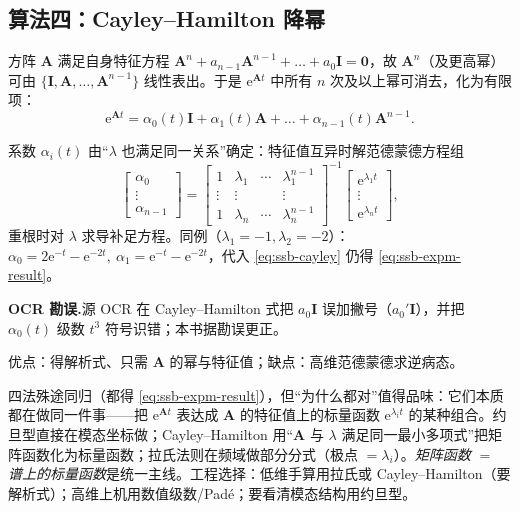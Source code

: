 \subsection{算法四：Cayley--Hamilton 降幂}
\begin{theorem}\label{thm:ssb-cayley}
方阵 $\mathbf{A}$ 满足自身特征方程 $\mathbf{A}^n+a_{n-1}\mathbf{A}^{n-1}+\dots+a_0\mathbf{I}=\mathbf{0}$，故 $\mathbf{A}^n$（及更高幂）可由 $\{\mathbf{I},\mathbf{A},\dots,\mathbf{A}^{n-1}\}$ 线性表出。于是 $\mathrm{e}^{\mathbf{A}t}$ 中所有 $n$ 次及以上幂可消去，化为有限项：
\begin{equation}
  \mathrm{e}^{\mathbf{A}t}=\alpha_0(t)\mathbf{I}+\alpha_1(t)\mathbf{A}+\dots+\alpha_{n-1}(t)\mathbf{A}^{n-1}.
  \label{eq:ssb-cayley}
\end{equation}
\end{theorem}
系数 $\alpha_i(t)$ 由“$\lambda$ 也满足同一关系”确定：特征值互异时解范德蒙德方程组
\begin{equation}
  \begin{bmatrix}\alpha_0\\\vdots\\\alpha_{n-1}\end{bmatrix}
  =\begin{bmatrix}1&\lambda_1&\cdots&\lambda_1^{n-1}\\\vdots&\vdots&&\vdots\\1&\lambda_n&\cdots&\lambda_n^{n-1}\end{bmatrix}^{-1}
  \begin{bmatrix}\mathrm{e}^{\lambda_1 t}\\\vdots\\\mathrm{e}^{\lambda_n t}\end{bmatrix},
  \label{eq:ssb-cayley-vander}
\end{equation}
重根时对 $\lambda$ 求导补足方程。同例（$\lambda_1=-1,\lambda_2=-2$）：$\alpha_0=2\mathrm{e}^{-t}-\mathrm{e}^{-2t},\ \alpha_1=\mathrm{e}^{-t}-\mathrm{e}^{-2t}$，代入 \cref{eq:ssb-cayley} 仍得 \cref{eq:ssb-expm-result}。
\begin{note}\textbf{OCR 勘误.}\;源 OCR 在 Cayley--Hamilton 式把 $a_0\mathbf{I}$ 误加撇号（$a_0'\mathbf{I}$），并把 $\alpha_0(t)$ 级数 $t^3$ 符号识错；本书据勘误更正\cite{liubao2006modern}。\end{note}
优点：得解析式、只需 $\mathbf{A}$ 的幂与特征值；缺点：高维范德蒙德求逆病态。

\begin{insight}
四法殊途同归（都得 \cref{eq:ssb-expm-result}），但“为什么都对”值得品味：它们本质都在做同一件事——把 $\mathrm{e}^{\mathbf{A}t}$ 表达成 $\mathbf{A}$ 的特征值上的标量函数 $\mathrm{e}^{\lambda_i t}$ 的某种组合。约旦型直接在模态坐标做；Cayley--Hamilton 用“$\mathbf{A}$ 与 $\lambda$ 满足同一最小多项式”把矩阵函数化为标量函数；拉氏法则在频域做部分分式（极点 $=\lambda_i$）。\emph{矩阵函数 $=$ 谱上的标量函数}是统一主线。工程选择：低维手算用拉氏或 Cayley--Hamilton（要解析式）；高维上机用数值级数/Padé；要看清模态结构用约旦型。
\end{insight}

